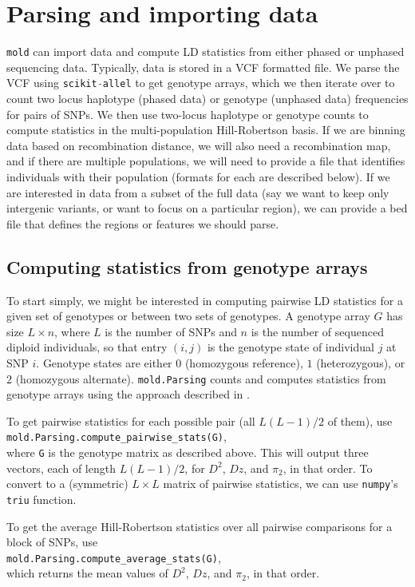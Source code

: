 \documentclass[10pt]{article}
\makeatletter
\renewcommand{\cite}{\citep}
\newcommand{\mold}{\texttt{mold}\xspace}
\newcommand{\py}[1]{\lstinline[breaklines=true,language=Python, showstringspaces=False]@#1@}
\makeatother
\begin{document}
\section{Parsing and importing data}

\mold can import data and compute LD statistics from either phased or unphased sequencing data.
Typically, data is stored in a VCF formatted file.
We parse the VCF using \py{scikit-allel} to get genotype arrays, which we then iterate over to count two locus haplotype (phased data) or genotype (unphased data) frequencies for pairs of SNPs.
We then use two-locus haplotype or genotype counts to compute statistics in the multi-population Hill-Robertson basis.
If we are binning data based on recombination distance, we will also need a recombination map, and if there are multiple populations, we will need to provide a file that identifies individuals with their population (formats for each are described below).
If we are interested in data from a subset of the full data (say we want to keep only intergenic variants, or want to focus on a particular region), we can provide a bed file that defines the regions or features we should parse.

\subsection{Computing statistics from genotype arrays}
To start simply, we might be interested in computing pairwise LD statistics for a given set of genotypes or between two sets of genotypes.
A genotype array $G$ has size $L\times n$, where $L$ is the number of SNPs and $n$ is the number of sequenced diploid individuals, so that entry $(i,j)$ is the genotype state of individual $j$ at SNP $i$.
Genotype states are either $0$ (homozygous reference), $1$ (heterozygous), or $2$ (homozygous alternate).
\py{mold.Parsing} counts and computes statistics from genotype arrays using the approach described in \cite{Ragsdale2019}.

To get pairwise statistics for each possible pair (all $L(L-1)/2$ of them), use \\\py{mold.Parsing.compute_pairwise_stats(G)}, \\
where \py{G} is the genotype matrix as described above.
This will output three vectors, each of length $L(L-1)/2$, for $D^2$, $Dz$, and $\pi_2$, in that order.
To convert to a (symmetric) $L\times L$ matrix of pairwise statistics, we can use \py{numpy}'s \py{triu} function.

To get the average Hill-Robertson statistics over all pairwise comparisons for a block of SNPs, use \\\py{mold.Parsing.compute_average_stats(G)}, \\which returns the mean values of $D^2$, $Dz$, and $\pi_2$, in that order.
\end{document}
